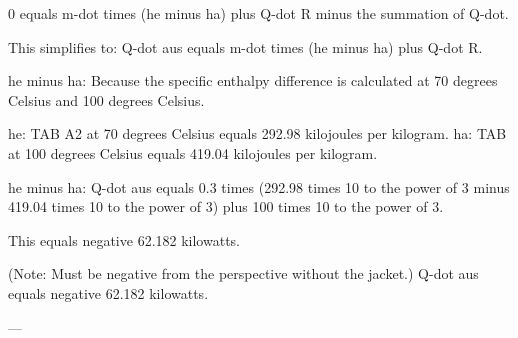 0 equals m-dot times (he minus ha) plus Q-dot R minus the summation of Q-dot.  

This simplifies to:  
Q-dot aus equals m-dot times (he minus ha) plus Q-dot R.  

he minus ha:  
Because the specific enthalpy difference is calculated at 70 degrees Celsius and 100 degrees Celsius.  

he: TAB A2 at 70 degrees Celsius equals 292.98 kilojoules per kilogram.  
ha: TAB at 100 degrees Celsius equals 419.04 kilojoules per kilogram.  

he minus ha:  
Q-dot aus equals 0.3 times (292.98 times 10 to the power of 3 minus 419.04 times 10 to the power of 3) plus 100 times 10 to the power of 3.  

This equals negative 62.182 kilowatts.  

(Note: Must be negative from the perspective without the jacket.)  
Q-dot aus equals negative 62.182 kilowatts.  

---